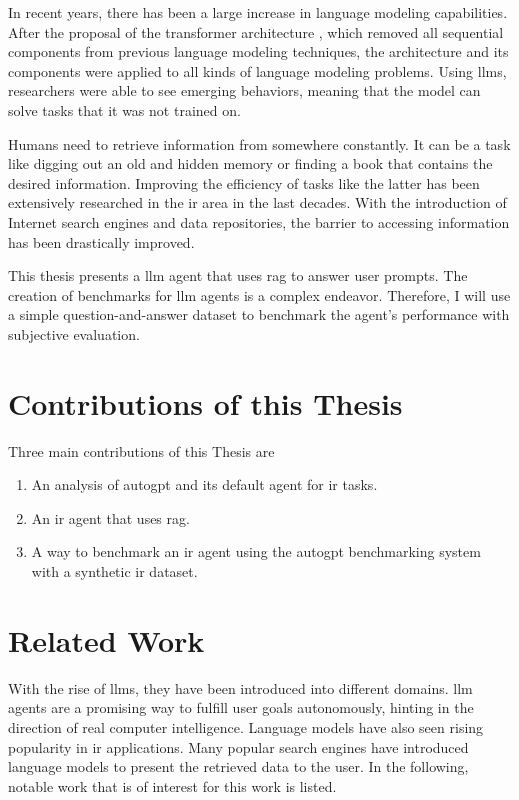 \documentclass[../main.tex]{subfiles}
\begin{document}
In recent years, there has been a large increase in language modeling capabilities.
After the proposal of the transformer architecture \cite{Vaswani2017},
which removed all sequential components from previous language modeling techniques,
the architecture and its components were applied to all kinds of language modeling problems.
Using \glspl{llm}, researchers were able to
see emerging behaviors, meaning that the model can solve tasks that it was not trained on.

Humans need to retrieve information from somewhere constantly.
It can be a task like digging out an old and hidden memory
or finding a book that contains the desired information.
Improving the efficiency of tasks like the latter
has been extensively researched in the \gls{ir} area in the last decades.
With the introduction of Internet search engines and data repositories,
the barrier to accessing information has been drastically improved.

This thesis presents a \gls{llm} agent that uses \gls{rag} to answer user prompts.
The creation of benchmarks for \gls{llm} agents is a complex endeavor.
Therefore, I will use a simple question-and-answer dataset
to benchmark the agent's performance with subjective evaluation.

\section{Contributions of this Thesis}

Three main contributions of this Thesis are

\begin{enumerate}
    \item An analysis of \gls{autogpt} and its default agent for \gls{ir} tasks.
    \item An \gls{ir} agent that uses \gls{rag}.
    \item A way to benchmark an \gls{ir} agent using the \gls{autogpt} benchmarking system with a synthetic \gls{ir} dataset.
\end{enumerate}

\section{Related Work}

With the rise of \glspl{llm}, they have been introduced into different domains.
\Gls{llm} agents are a promising way to fulfill user goals autonomously,
hinting in the direction of real computer intelligence.
Language models have also seen rising popularity in \gls{ir} applications.
Many popular search engines have introduced language models to present the retrieved data to the user.
In the following, notable work that is of interest for this work is listed.
\end{document}
